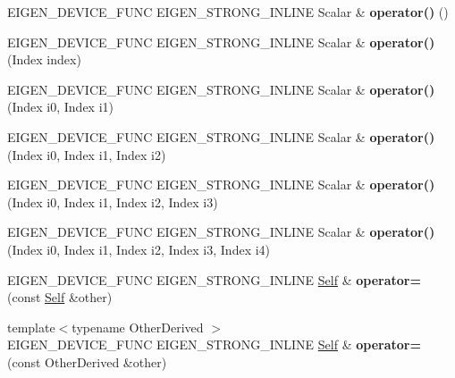 \begin{DoxyCompactItemize}
\item 
\mbox{\label{class_eigen_1_1_tensor_map_ae2ca27252dfd6872df00f3d6199d3c30}} 
E\+I\+G\+E\+N\+\_\+\+D\+E\+V\+I\+C\+E\+\_\+\+F\+U\+NC E\+I\+G\+E\+N\+\_\+\+S\+T\+R\+O\+N\+G\+\_\+\+I\+N\+L\+I\+NE Scalar \& {\bfseries operator()} ()
\item 
\mbox{\label{class_eigen_1_1_tensor_map_a6dfdb32393949783fa2d207b1f4fc060}} 
E\+I\+G\+E\+N\+\_\+\+D\+E\+V\+I\+C\+E\+\_\+\+F\+U\+NC E\+I\+G\+E\+N\+\_\+\+S\+T\+R\+O\+N\+G\+\_\+\+I\+N\+L\+I\+NE Scalar \& {\bfseries operator()} (Index index)
\item 
\mbox{\label{class_eigen_1_1_tensor_map_a814ba01dddc7d064864c9e0b73177546}} 
E\+I\+G\+E\+N\+\_\+\+D\+E\+V\+I\+C\+E\+\_\+\+F\+U\+NC E\+I\+G\+E\+N\+\_\+\+S\+T\+R\+O\+N\+G\+\_\+\+I\+N\+L\+I\+NE Scalar \& {\bfseries operator()} (Index i0, Index i1)
\item 
\mbox{\label{class_eigen_1_1_tensor_map_a349d0ba8aa667a753b255eba778bd1e7}} 
E\+I\+G\+E\+N\+\_\+\+D\+E\+V\+I\+C\+E\+\_\+\+F\+U\+NC E\+I\+G\+E\+N\+\_\+\+S\+T\+R\+O\+N\+G\+\_\+\+I\+N\+L\+I\+NE Scalar \& {\bfseries operator()} (Index i0, Index i1, Index i2)
\item 
\mbox{\label{class_eigen_1_1_tensor_map_ac39f341876b165a99e3add4aa67a240f}} 
E\+I\+G\+E\+N\+\_\+\+D\+E\+V\+I\+C\+E\+\_\+\+F\+U\+NC E\+I\+G\+E\+N\+\_\+\+S\+T\+R\+O\+N\+G\+\_\+\+I\+N\+L\+I\+NE Scalar \& {\bfseries operator()} (Index i0, Index i1, Index i2, Index i3)
\item 
\mbox{\label{class_eigen_1_1_tensor_map_ab4e98c03d9cf22edccc9c1644da7e186}} 
E\+I\+G\+E\+N\+\_\+\+D\+E\+V\+I\+C\+E\+\_\+\+F\+U\+NC E\+I\+G\+E\+N\+\_\+\+S\+T\+R\+O\+N\+G\+\_\+\+I\+N\+L\+I\+NE Scalar \& {\bfseries operator()} (Index i0, Index i1, Index i2, Index i3, Index i4)
\item 
\mbox{\label{class_eigen_1_1_tensor_map_a7a025b2315e0f38623686647f6776526}} 
E\+I\+G\+E\+N\+\_\+\+D\+E\+V\+I\+C\+E\+\_\+\+F\+U\+NC E\+I\+G\+E\+N\+\_\+\+S\+T\+R\+O\+N\+G\+\_\+\+I\+N\+L\+I\+NE \hyperlink{class_eigen_1_1_tensor_map}{Self} \& {\bfseries operator=} (const \hyperlink{class_eigen_1_1_tensor_map}{Self} \&other)
\item 
\mbox{\label{class_eigen_1_1_tensor_map_ac7426162ffc477e871bed521fbb5e1cc}} 
{\footnotesize template$<$typename Other\+Derived $>$ }\\E\+I\+G\+E\+N\+\_\+\+D\+E\+V\+I\+C\+E\+\_\+\+F\+U\+NC E\+I\+G\+E\+N\+\_\+\+S\+T\+R\+O\+N\+G\+\_\+\+I\+N\+L\+I\+NE \hyperlink{class_eigen_1_1_tensor_map}{Self} \& {\bfseries operator=} (const Other\+Derived \&other)
\end{DoxyCompactItemize}
